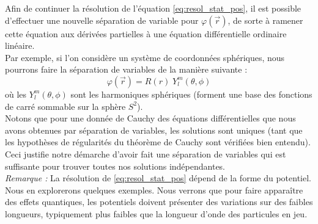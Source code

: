 \documentclass{book}
\begin{document}
Afin de continuer la résolution de l'équation \eqref{eq:resol_stat_pos}, il est possible d'effectuer une nouvelle séparation de variable pour $\varphi(\vec{r})$, de sorte à ramener cette équation aux dérivées partielles à une équation différentielle ordinaire linéaire. \\
Par exemple, si l'on considère un système de coordonnées sphériques, nous pourrons faire la séparation de variables de la manière suivante : 
\begin{equation}
  \varphi(\vec{r}) = R(r) \; Y^m_l(\theta, \phi)
\end{equation}
où les $Y^m_l(\theta, \phi)$ sont les harmoniques sphériques (forment une base des fonctions de carré sommable sur la sphère $S^2$). \\


Notons que pour une donnée de Cauchy des équations différentielles que nous avons obtenues par séparation de variables, les solutions sont uniques (tant que les hypothèses de régularités du théorème de Cauchy sont vérifiées bien entendu). Ceci justifie notre démarche d'avoir fait une séparation de variables qui est suffisante pour trouver toutes nos solutions indépendantes. \\

\textit{Remarque : }La résolution de \eqref{eq:resol_stat_pos} dépend de la forme du potentiel. Nous en explorerons quelques exemples. Nous verrons que pour faire apparaître des effets quantiques, les potentiels doivent présenter des variations sur des faibles longueurs, typiquement plus faibles que la longueur d'onde des particules en jeu. \\
\end{document}
